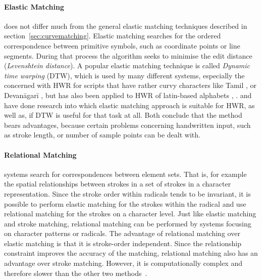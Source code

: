 \paragraph{Elastic Matching} does not differ much from the general elastic matching 
techniques described in section~\ref{sec:curvematching}. Elastic matching 
searches for the ordered correspondence between primitive symbols, such as 
coordinate points or line segments. During that process the algorithm seeks to
minimise the edit distance (\emph{Levenshtein distance}). A popular elastic 
matching technique is called \emph{Dynamic time warping} (DTW), which is used by
many different systems, especially the concerned with HWR for scripts that
have rather curvy characters like Tamil ,  or Devanāgarī , but has also been applied to HWR of
latin-based alphabets , .
 and  have done research into which 
elastic matching approach is suitable for HWR, as well as, if DTW is useful for 
that task at all. Both conclude that the method bears advantages, because 
certain problems concerning handwritten input, such as stroke length, or number 
of sample points can be dealt with.

\paragraph{Relational Matching} systems search for correspondences between element sets. That is, for example the spatial relationships between strokes in a set of 
strokes in a character representation. Since the stroke order within radicals
tends to be invariant, it is possible to perform elastic matching for the strokes
within the radical and use relational matching for the strokes on a character 
level. Just like elastic matching and stroke matching, relational matching can
be performed by systems focusing on character patterns or radicals.
The advantage of relational matching over elastic matching is that it is 
stroke-order independent. Since the relationship constraint improves the accuracy
of the matching, relational matching also has an advantage over stroke matching.
However, it is computationally complex and therefore slower than the other 
two methods~.

